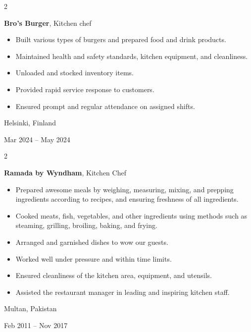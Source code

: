 \documentclass[10pt, a4paper]{article}
\newenvironment{highlights}{
    \begin{itemize}[
        topsep=0.10 cm,
        parsep=0.10 cm,
        partopsep=0pt,
        itemsep=0pt,
        leftmargin=0 cm + 10pt
    ]
}{
    \end{itemize}
} %
\newenvironment{twocolentry}[2][]{
    \onecolentry
    \def\secondColumn{#2}
    \setcolumnwidth{\fill, 2.5 cm}
    \begin{paracol}{2}
}{
    \switchcolumn \raggedleft \secondColumn
    \end{paracol}
    \endonecolentry
} %
\begin{document}
        \vspace{0.2 cm}

        \begin{twocolentry}{
            Helsinki, Finland

        Mar 2024 – May 2024
        }
            \textbf{Bro's Burger}, Kitchen chef
            \begin{highlights}
                \item Built various types of burgers and prepared food and drink products.
                \item Maintained health and safety standards, kitchen equipment, and cleanliness.
                \item Unloaded and stocked inventory items.
                \item Provided rapid service response to customers.
                \item Ensured prompt and regular attendance on assigned shifts.
            \end{highlights}
        \end{twocolentry}


        \vspace{0.2 cm}

        \begin{twocolentry}{
            Multan, Pakistan

        Feb 2011 – Nov 2017
        }
            \textbf{Ramada by Wyndham}, Kitchen Chef
            \begin{highlights}
                \item Prepared awesome meals by weighing, measuring, mixing, and prepping ingredients according to recipes, and ensuring freshness of all ingredients.
                \item Cooked meats, fish, vegetables, and other ingredients using methods such as steaming, grilling, broiling, baking, and frying.
                \item Arranged and garnished dishes to wow our guests.
                \item Worked well under pressure and within time limits.
                \item Ensured cleanliness of the kitchen area, equipment, and utensils.
                \item Assisted the restaurant manager in leading and inspiring kitchen staff.
            \end{highlights}
        \end{twocolentry}
\end{document}
